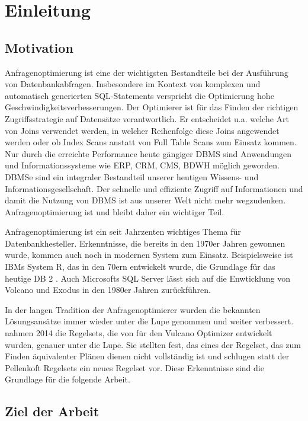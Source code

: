 \chapter{Einleitung}

\section{Motivation}
Anfragenoptimierung ist eine der wichtigsten Bestandteile bei der Ausführung von Datenbankabfragen. Insbesondere im Kontext von komplexen und automatisch generierten SQL-Statements verspricht die Optimierung hohe Geschwindigkeitsverbesserungen. Der Optimierer ist für das Finden der richtigen Zugriffsstrategie auf Datensätze verantwortlich. Er entscheidet u.a. welche Art von Joins verwendet werden, in welcher Reihenfolge diese Joins angewendet werden oder ob Index Scans anstatt von Full Table Scans zum Einsatz kommen. Nur durch die erreichte Performance heute gängiger \ac{DBMS} sind Anwendungen und Informationssysteme wie \ac{ERP}, \ac{CRM}, \ac{CMS}, \ac{BDWH} möglich geworden. \ac{DBMS}e sind ein integraler Bestandteil unserer heutigen Wissens- und Informationsgesellschaft. Der schnelle und effiziente Zugriff auf Informationen und damit die Nutzung von \ac{DBMS} ist aus unserer Welt nicht mehr wegzudenken. Anfragenoptimierung ist und bleibt daher ein wichtiger Teil.

Anfragenoptimierung ist ein seit Jahrzenten wichtiges Thema für Datenbankhesteller. Erkenntnisse, die bereits in den 1970er Jahren gewonnen wurde, kommen auch noch in modernen System zum Einsatz. Beispielsweise ist IBMs System R, das in den 70ern entwickelt wurde, die Grundlage für das heutige DB 2  \cite{wade2012ibm}. Auch Microsofts SQL Server lässt sich auf die Enwticklung von Volcano und Exodus in den 1980er Jahren zurückführen.

In der langen Tradition der Anfragenoptimierer wurden die bekannten Lösungsansätze immer wieder unter die Lupe genommen und weiter verbessert.  \cite{shanbhag2014optimizing} nahmen 2014 die Regelsets, die von \cite{pellenkoft1997complexity} für den Vulcano Optimizer entwickelt wurden, genauer unter die Lupe. Sie stellten fest, das eines der Regelset, das zum Finden äquivalenter Plänen dienen nicht vollständig ist und schlugen statt der Pellenkoft Regelsets ein neues Regelset vor. Diese Erkenntnisse sind die Grundlage für die folgende Arbeit.

\section{Ziel der Arbeit}


